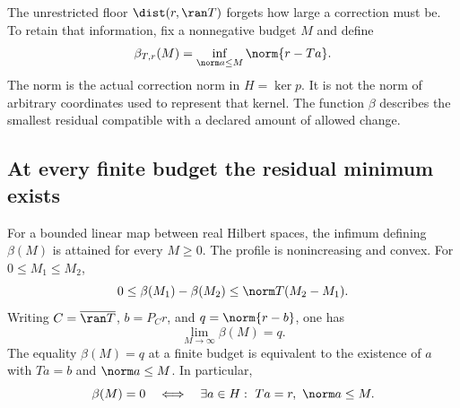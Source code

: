 \label{sec:budget-frontier}
The unrestricted floor $\dist(r,\ran T)$ forgets how large a correction must be. To retain that information, fix a nonnegative budget $M$ and define
\[
 \beta_{T,r}(M)=\inf_{\norm a\le M}\norm{r-Ta}.
\]
The norm is the actual correction norm in $H=\ker p$. It is not the norm of arbitrary coordinates used to represent that kernel. The function $\beta$ describes the smallest residual compatible with a declared amount of allowed change.

\subsection{At every finite budget the residual minimum exists}
\begin{theorem}\label{WR03}
For a bounded linear map between real Hilbert spaces, the infimum defining $\beta(M)$ is attained for every $M\ge0$. The profile is nonincreasing and convex. For $0\le M_1\le M_2$,
\[
 0\le\beta(M_1)-\beta(M_2)\le\norm T(M_2-M_1).
\]
Writing $C=\overline{\ran T}$, $b=P_Cr$, and $q=\norm{r-b}$, one has
\[
 \lim_{M\to\infty}\beta(M)=q.
\]
The equality $\beta(M)=q$ at a finite budget is equivalent to the existence of $a$ with $Ta=b$ and $\norm a\le M$. In particular,
\[
 \beta(M)=0\quad\Longleftrightarrow\quad
 \exists a\in H:\ Ta=r,\ \norm a\le M.
\]
\end{theorem}
